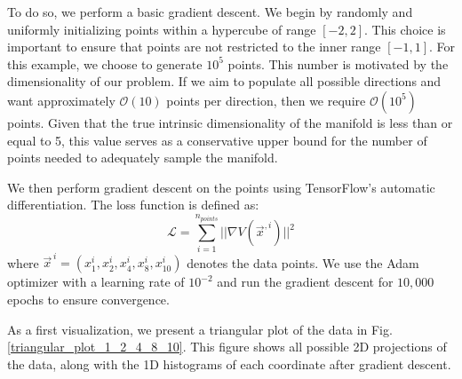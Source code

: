 \documentclass[11pt]{article}
\begin{document}
		To do so, we perform a basic gradient descent. We begin by randomly and uniformly initializing points within a hypercube of range $[-2,2]$. This choice is important to ensure that points are not restricted to the inner range $[-1,1]$. For this example, we choose to generate $10^5$ points. This number is motivated by the dimensionality of our problem. If we aim to populate all possible directions and want approximately $\mathcal{O}(10)$ points per direction, then we require $\mathcal{O}(10^5)$ points. Given that the true intrinsic dimensionality of the manifold is less than or equal to 5, this value serves as a conservative upper bound for the number of points needed to adequately sample the manifold.
		
		We then perform gradient descent on the points using TensorFlow’s automatic differentiation. The loss function is defined as:
		\begin{equation}
			\mathcal{L} = \sum_{i = 1}^{n_{points}} || \nabla V(\vec{x}^{,i})||^2
		\end{equation}
		where $\vec{x}^{\,i} = (x^i_1,x^i_2,x^i_4,x^i_8,x^i_{10})$ denotes the data points. We use the Adam optimizer with a learning rate of $10^{-2}$ and run the gradient descent for $10,000$ epochs to ensure convergence.
		
		
		As a first visualization, we present a triangular plot of the data in Fig. \ref{triangular_plot_1_2_4_8_10}. This figure shows all possible 2D projections of the data, along with the 1D histograms of each coordinate after gradient descent.
		
\end{document}
